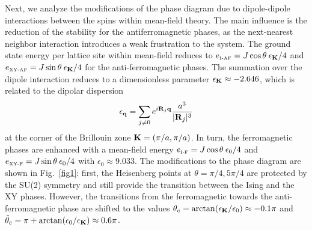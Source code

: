  
Next, we analyze the modifications of the phase diagram due to dipole-dipole 
interactions between the spins within mean-field theory. The
main influence is the reduction of the stability for the antiferromagnetic
phases, as the next-nearest neighbor interaction introduces a  weak frustration
to the system. The ground state energy per lattice site within mean-field
reduces to $  e_{\mbox{\tiny I-AF}} = J \cos \theta \: \epsilon_{\bf K}/4$ and $e_{\mbox{\tiny XY-AF}} = J \sin \theta \: \epsilon_{\bf K}/4$
for the anti-ferromagnetic phases. The summation over the dipole interaction
reduces to a dimensionless parameter $\epsilon_{\bf K} \approx -2.646$, which is related to
the dipolar dispersion 
%
\begin{equation}
 \epsilon_{\bf q} = \sum_{j \neq 0} e^{i {\bf R}_{j} {\bf q}}\frac{a^3}{|{\bf R}_{j}|^3}
   \label{dipoledispersion}
\end{equation}
%
at the corner of the Brillouin zone ${\bf K} = (\pi/a, \pi /a)$.
In turn, the ferromagnetic phases are enhanced with a mean-field energy
$e_{\mbox{\tiny I-F}} =  J \cos \theta \: \epsilon_0/4 $  and $ e_{\mbox{\tiny XY-F}} =  J \sin \theta \: \epsilon_0/4$
with $\epsilon_{0}  \approx 9.033$. The modifications to the
phase diagram are shown in Fig.~\ref{fig1}: first, the Heisenberg points at
$\theta = \pi/4,  5 \pi/4$ are protected by the SU(2) symmetry and still
provide the transition between the Ising and the XY phases. However, the
transitions from the ferromagnetic towards the anti-ferromagnetic phase are
shifted to the values  $\theta_{c}= \arctan(\epsilon_{\bf K}/\epsilon_{0}) 
\approx -0.1 \pi$ and $\tilde{\theta}_c = \pi+ \arctan(\epsilon_{0}/\epsilon_{\bf K})\approx 0.6 \pi$.


 

